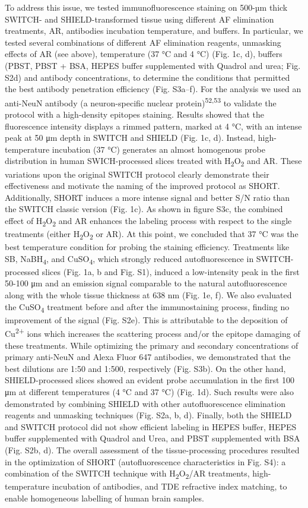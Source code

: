 \documentclass{article}
\begin{document}
To address this issue, we tested immunofluorescence staining on 500-µm thick SWITCH- and SHIELD-transformed tissue using different AF elimination treatments, AR, antibodies incubation temperature, and buffers. In particular, we tested several combinations of different AF elimination reagents, unmasking effects of AR (see above), temperature (37 °C and 4 °C) (Fig. 1c, d), buffers (PBST, PBST + BSA, HEPES buffer supplemented with Quadrol and urea; Fig. S2d) and antibody concentrations, to determine the conditions that permitted the best antibody penetration efficiency (Fig. S3a–f). For the analysis we used an anti-NeuN antibody (a neuron-specific nuclear protein)\textsuperscript{52,53} to validate the protocol with a high-density epitopes staining. Results showed that the fluorescence intensity displays a rimmed pattern, marked at 4 °C, with an intense peak at 50 μm depth in SWITCH and SHIELD (Fig. 1c, d). Instead, high-temperature incubation (37 °C) generates an almost homogenous probe distribution in human SWICH-processed slices treated with H\textsubscript{2}O\textsubscript{2} and AR. These variations upon the original SWITCH protocol clearly demonstrate their effectiveness and motivate the naming of the improved protocol as SHORT. Additionally, SHORT induces a more intense signal and better S/N ratio than the SWITCH classic version (Fig. 1c). As shown in figure S3c, the combined effect of H\textsubscript{2}O\textsubscript{2} and AR enhances the labeling process with respect to the single treatments (either H\textsubscript{2}O\textsubscript{2} or AR). At this point, we concluded that 37 °C was the best temperature condition for probing the staining efficiency. Treatments like SB, NaBH\textsubscript{4}, and CuSO\textsubscript{4}, which strongly reduced autofluorescence in SWITCH-processed slices (Fig. 1a, b and Fig. S1), induced a low-intensity peak in the first 50-100 μm and an emission signal comparable to the natural autofluorescence along with the whole tissue thickness at 638 nm (Fig. 1e, f). We also evaluated the CuSO\textsubscript{4} treatment before and after the immunostaining process, finding no improvement of the signal (Fig. S2e). This is attributable to the deposition of Cu\textsuperscript{2+} ions which increases the scattering process and/or the epitope damaging of these treatments. While optimizing the primary and secondary concentrations of primary anti-NeuN and Alexa Fluor 647 antibodies, we demonstrated that the best dilutions are 1:50 and 1:500, respectively (Fig. S3b). On the other hand, SHIELD-processed slices showed an evident probe accumulation in the first 100 μm at different temperatures (4 °C and 37 °C) (Fig. 1d). Such results were also demonstrated by combining SHIELD with other autofluorescence elimination reagents and unmasking techniques (Fig. S2a, b, d). Finally, both the SHIELD and SWITCH protocol did not show efficient labeling in HEPES buffer, HEPES buffer supplemented with Quadrol and Urea, and PBST supplemented with BSA (Fig. S2b, d). The overall assessment of the tissue-processing procedures resulted in the optimization of SHORT (autofluorescence characteristics in Fig. S4): a combination of the SWITCH technique with H\textsubscript{2}O\textsubscript{2}/AR treatments, high-temperature incubation of antibodies, and TDE refractive index matching, to enable homogeneous labelling of human brain samples.
\end{document}
